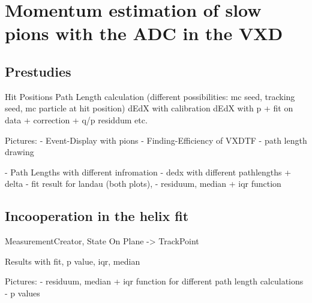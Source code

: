 \chapter{Momentum estimation of slow pions with the ADC in the VXD}

\section{Prestudies}

Hit Positions
Path Length calculation (different possibilities: mc seed, tracking seed, mc particle at hit position)
dEdX with calibration
dEdX with p + fit on data + correction + q/p residdum etc.

Pictures:
- Event-Display with pions
- Finding-Efficiency of VXDTF
- path length drawing

- Path Lengths with different infromation
- dedx with different pathlengths + delta
- fit result for landau (both plots),
- residuum, median + iqr function


\section{Incooperation in the helix fit}

MeasurementCreator, State On Plane -> TrackPoint

Results with fit, p value, iqr, median

Pictures:
- residuum, median + iqr function for different path length calculations
- p values